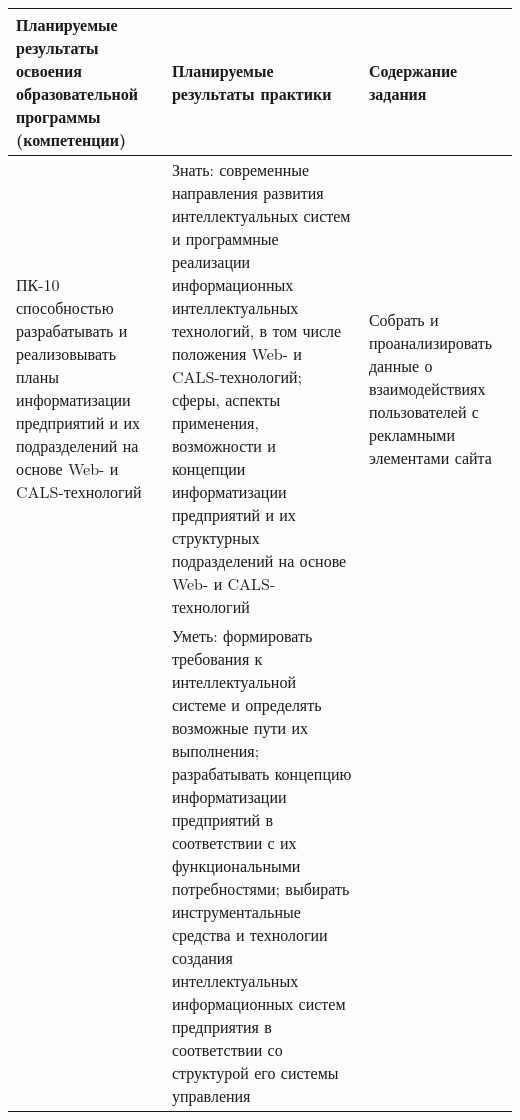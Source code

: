 \documentclass[a4paper, 12pt]{extreport}
\begin{document}
    \noindent\begin{longtable}{|m{4.5cm}|m{6.5cm}|m{4.5cm}|}
                 \hline
                 Планируемые результаты освоения образовательной программы (компетенции) &
                 Планируемые результаты практики &
                 {Содержание задания} \\
                 \hline
                 ПК-10 способностью разрабатывать и реализовывать планы информатизации предприятий и их подразделений
                 на основе Web- и CALS-технологий &
                 Знать: современные направления развития интеллектуальных систем и программные реализации информационных
                 интеллектуальных технологий, в том числе положения Web- и CALS-технологий; сферы, аспекты применения,
                 возможности и концепции информатизации предприятий и их структурных подразделений на основе Web- и
                 CALS-технологий
                 & Собрать и проанализировать данные о взаимодействиях пользователей с рекламными элементами сайта \\

                 & Уметь: формировать требования к интеллектуальной системе и определять возможные пути их выполнения;
                 разрабатывать концепцию информатизации предприятий в соответствии с их функциональными потребностями;
                 выбирать инструментальные средства и технологии создания интеллектуальных информационных систем
                 предприятия в соответствии со структурой его системы управления & \\
                 \hline


\end{longtable}
\end{document}
